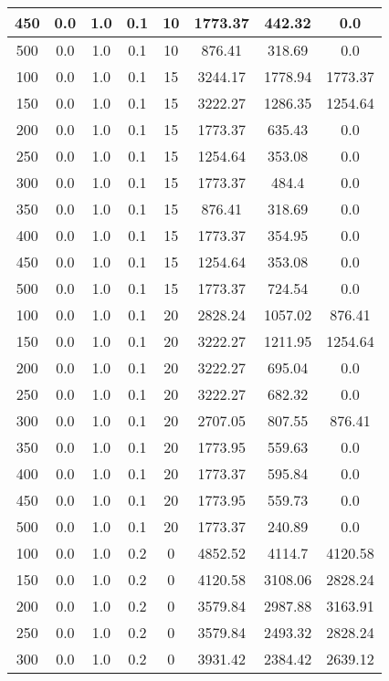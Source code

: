 \documentclass[a4paper, 12pt]{extreport}
\begin{document}
\begin{itemize}
\begin{longtable}{|c|c|c|c|c|c|c|c|}
			450 & 0.0 & 1.0 & 0.1 & 10 & 1773.37 & 442.32 & 0.0 \\\hline
			500 & 0.0 & 1.0 & 0.1 & 10 & 876.41 & 318.69 & 0.0 \\\hline
			100 & 0.0 & 1.0 & 0.1 & 15 & 3244.17 & 1778.94 & 1773.37 \\\hline
			150 & 0.0 & 1.0 & 0.1 & 15 & 3222.27 & 1286.35 & 1254.64 \\\hline
			200 & 0.0 & 1.0 & 0.1 & 15 & 1773.37 & 635.43 & 0.0 \\\hline
			250 & 0.0 & 1.0 & 0.1 & 15 & 1254.64 & 353.08 & 0.0 \\\hline
			300 & 0.0 & 1.0 & 0.1 & 15 & 1773.37 & 484.4 & 0.0 \\\hline
			350 & 0.0 & 1.0 & 0.1 & 15 & 876.41 & 318.69 & 0.0 \\\hline
			400 & 0.0 & 1.0 & 0.1 & 15 & 1773.37 & 354.95 & 0.0 \\\hline
			450 & 0.0 & 1.0 & 0.1 & 15 & 1254.64 & 353.08 & 0.0 \\\hline
			500 & 0.0 & 1.0 & 0.1 & 15 & 1773.37 & 724.54 & 0.0 \\\hline
			100 & 0.0 & 1.0 & 0.1 & 20 & 2828.24 & 1057.02 & 876.41 \\\hline
			150 & 0.0 & 1.0 & 0.1 & 20 & 3222.27 & 1211.95 & 1254.64 \\\hline
			200 & 0.0 & 1.0 & 0.1 & 20 & 3222.27 & 695.04 & 0.0 \\\hline
			250 & 0.0 & 1.0 & 0.1 & 20 & 3222.27 & 682.32 & 0.0 \\\hline
			300 & 0.0 & 1.0 & 0.1 & 20 & 2707.05 & 807.55 & 876.41 \\\hline
			350 & 0.0 & 1.0 & 0.1 & 20 & 1773.95 & 559.63 & 0.0 \\\hline
			400 & 0.0 & 1.0 & 0.1 & 20 & 1773.37 & 595.84 & 0.0 \\\hline
			450 & 0.0 & 1.0 & 0.1 & 20 & 1773.95 & 559.73 & 0.0 \\\hline
			500 & 0.0 & 1.0 & 0.1 & 20 & 1773.37 & 240.89 & 0.0 \\\hline
			100 & 0.0 & 1.0 & 0.2 & 0 & 4852.52 & 4114.7 & 4120.58 \\\hline
			150 & 0.0 & 1.0 & 0.2 & 0 & 4120.58 & 3108.06 & 2828.24 \\\hline
			200 & 0.0 & 1.0 & 0.2 & 0 & 3579.84 & 2987.88 & 3163.91 \\\hline
			250 & 0.0 & 1.0 & 0.2 & 0 & 3579.84 & 2493.32 & 2828.24 \\\hline
			300 & 0.0 & 1.0 & 0.2 & 0 & 3931.42 & 2384.42 & 2639.12 \\\hline

\end{longtable}
\end{itemize}
\end{document}
